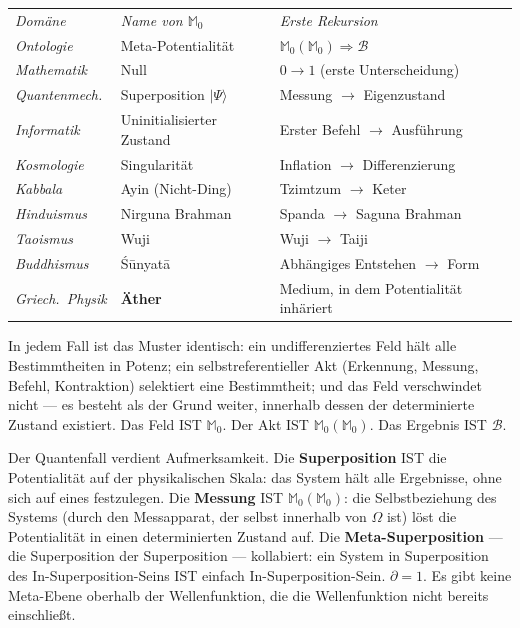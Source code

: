 \documentclass[10pt, openany, oneside]{book}
\renewcommand{\footnotesize}{\fontsize{8.5}{11}\selectfont}
\begin{document}
{\footnotesize
\noindent\begin{tabular}{l l p{}}
\textit{Domäne} & \textit{Name von $\mathbb{M}_0$} & \textit{Erste Rekursion} \\[0.3em]
\textit{Ontologie} & Meta-Potentialität & $\mathbb{M}_0(\mathbb{M}_0) \Rightarrow \mathcal{B}$ \\[0.2em]
\textit{Mathematik} & Null & $0 \to 1$ (erste Unterscheidung) \\[0.2em]
\textit{Quantenmech.} & Superposition $|\Psi\rangle$ & Messung $\to$ Eigenzustand \\[0.2em]
\textit{Informatik} & Uninitialisierter Zustand & Erster Befehl $\to$ Ausführung \\[0.2em]
\textit{Kosmologie} & Singularität & Inflation $\to$ Differenzierung \\[0.2em]
\textit{Kabbala} & Ayin (Nicht-Ding) & Tzimtzum $\to$ Keter \\[0.2em]
\textit{Hinduismus} & Nirguna Brahman & Spanda $\to$ Saguna Brahman \\[0.2em]
\textit{Taoismus} & Wuji & Wuji $\to$ Taiji \\[0.2em]
\textit{Buddhismus} & \'{S}\={u}nyat\={a} & Abhängiges Entstehen $\to$ Form \\[0.2em]
\textit{Griech.\ Physik} & \textbf{Äther} & Medium, in dem Potentialität inhäriert \\[0.2em]
\end{tabular}
}

\vspace{0.8em}

\noindent In jedem Fall ist das Muster identisch: ein undifferenziertes Feld hält alle Bestimmtheiten in Potenz; ein selbstreferentieller Akt (Erkennung, Messung, Befehl, Kontraktion) selektiert eine Bestimmtheit; und das Feld verschwindet nicht --- es besteht als der Grund weiter, innerhalb dessen der determinierte Zustand existiert. Das Feld IST $\mathbb{M}_0$. Der Akt IST $\mathbb{M}_0(\mathbb{M}_0)$. Das Ergebnis IST $\mathcal{B}$.

Der Quantenfall verdient Aufmerksamkeit. Die \textbf{Superposition} IST die Potentialität auf der physikalischen Skala: das System hält alle Ergebnisse, ohne sich auf eines festzulegen. Die \textbf{Messung} IST $\mathbb{M}_0(\mathbb{M}_0)$: die Selbstbeziehung des Systems (durch den Messapparat, der selbst innerhalb von $\Omega$ ist) löst die Potentialität in einen determinierten Zustand auf. Die \textbf{Meta-Superposition} --- die Superposition der Superposition --- kollabiert: ein System in Superposition des In-Superposition-Seins IST einfach In-Superposition-Sein. $\partial = 1$. Es gibt keine Meta-Ebene oberhalb der Wellenfunktion, die die Wellenfunktion nicht bereits einschließt.
\end{document}

